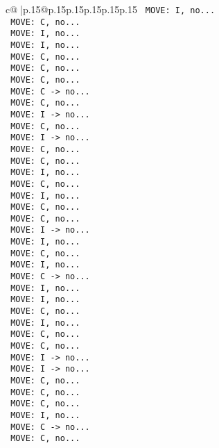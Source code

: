 \documentclass{article}
\begin{document}
{\begin{supertabular}{c@{$\;$}|p{.15\linewidth}@{}p{.15\linewidth}p{.15\linewidth}p{.15\linewidth}p{.15\linewidth}p{.15\linewidth}}
{{{\texttt{ MOVE: I, no...} \\
\texttt{ MOVE: C, no...} \\
\texttt{ MOVE: I, no...} \\
\texttt{ MOVE: I, no...} \\
\texttt{ MOVE: C, no...} \\
\texttt{ MOVE: C, no...} \\
\texttt{ MOVE: C, no...} \\
\texttt{ MOVE: C {-}> no...} \\
\texttt{ MOVE: C, no...} \\
\texttt{ MOVE: I {-}> no...} \\
\texttt{ MOVE: C, no...} \\
\texttt{ MOVE: I {-}> no...} \\
\texttt{ MOVE: C, no...} \\
\texttt{ MOVE: C, no...} \\
\texttt{ MOVE: I, no...} \\
\texttt{ MOVE: C, no...} \\
\texttt{ MOVE: I, no...} \\
\texttt{ MOVE: C, no...} \\
\texttt{ MOVE: C, no...} \\
\texttt{ MOVE: I {-}> no...} \\
\texttt{ MOVE: I, no...} \\
\texttt{ MOVE: C, no...} \\
\texttt{ MOVE: I, no...} \\
\texttt{ MOVE: C {-}> no...} \\
\texttt{ MOVE: I, no...} \\
\texttt{ MOVE: I, no...} \\
\texttt{ MOVE: C, no...} \\
\texttt{ MOVE: I, no...} \\
\texttt{ MOVE: C, no...} \\
\texttt{ MOVE: C, no...} \\
\texttt{ MOVE: I {-}> no...} \\
\texttt{ MOVE: I {-}> no...} \\
\texttt{ MOVE: C, no...} \\
\texttt{ MOVE: C, no...} \\
\texttt{ MOVE: C, no...} \\
\texttt{ MOVE: I, no...} \\
\texttt{ MOVE: C {-}> no...} \\
\texttt{ MOVE: C, no...} \\
}}}
\end{supertabular}}
\end{document}
